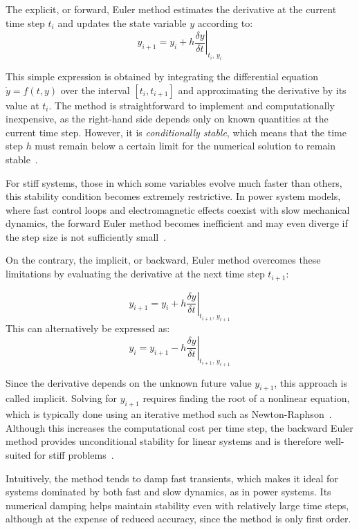 The explicit, or forward, Euler method estimates the derivative at the current time step $t_i$ and updates the state variable $y$ according to:
\begin{equation}
    y_{i+1} = y_i + h \left.\frac{\delta y}{\delta t}\right|_{t_i, \, y_i}
    \label{eq:forward_euler}
\end{equation}

This simple expression is obtained by integrating the differential equation
$\dot{y} = f(t, y)$ over the interval $[t_i, t_{i+1}]$ and approximating the derivative by its value at $t_i$. The method is straightforward to implement and
computationally inexpensive, as the right-hand side depends only on known quantities at the current time step. However, it is \textit{conditionally stable},
which means that the time step $h$ must remain below a certain limit for the numerical solution to remain stable~\cite{Butcher2008}. 

For stiff systems, those in which some variables evolve much faster than others, this stability condition becomes extremely restrictive.
In power system models, where fast control loops and electromagnetic effects coexist with slow mechanical dynamics, the forward Euler method becomes inefficient and may
even diverge if the step size is not sufficiently small~\cite{LaraTDS}.

On the contrary, the implicit, or backward, Euler method overcomes these limitations by evaluating the derivative at the next time step $t_{i+1}$:

\begin{equation}
    y_{i+1} = y_i + h \left.\frac{\delta y}{\delta t}\right|_{t_{i+1}, \, y_{i+1}}
    \label{eq:backward_euler}
\end{equation}
This can alternatively be expressed as:
\begin{equation}
    y_i = y_{i+1} - h \left.\frac{\delta y}{\delta t}\right|_{t_{i+1}, \, y_{i+1}}
\end{equation}

Since the derivative depends on the unknown future value $y_{i+1}$, this approach is called implicit. Solving for $y_{i+1}$ requires finding the root of a
nonlinear equation, which is typically done using an iterative method such as Newton-Raphson~\cite{Hindmarsh1995}. Although this increases the computational cost per
time step, the backward Euler method provides unconditional stability for linear systems and is therefore well-suited for stiff problems~\cite{Butcher2008}. 

Intuitively, the method tends to damp fast transients, which makes it ideal for systems dominated by both fast and slow dynamics, as in power systems.
Its numerical damping helps maintain stability even with relatively large time steps, although at the expense of reduced accuracy, since the method is only first order.

